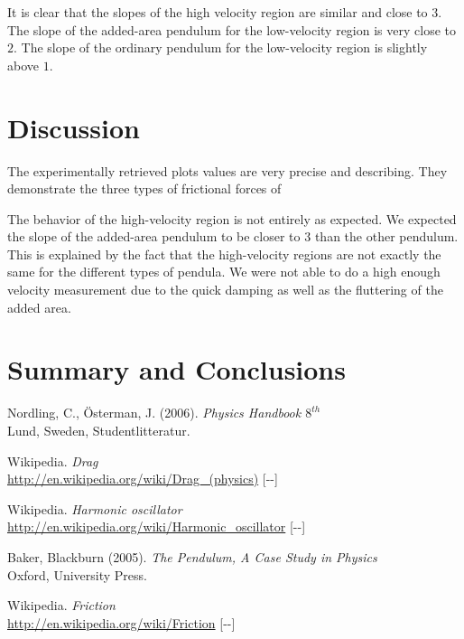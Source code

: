 \documentclass[11pt, a4paper]{article}
\newcommand{\todayswe}{\the\year-\twodigit\month-\twodigit\day}
\begin{document}
It is clear that the slopes of the high velocity region are similar and close to $3$. 
The slope of the added-area pendulum for the low-velocity region is very close to $2$.
The slope of the ordinary pendulum for the low-velocity region is slightly above $1$.



\section{Discussion}
The experimentally retrieved plots values are very precise and describing. 
They demonstrate the three types of frictional forces of 

The behavior of the high-velocity region is not entirely as expected. We expected 
the slope of the added-area pendulum 
to be closer to $3$ than the other pendulum.
This is explained by the fact that the high-velocity regions are not exactly the 
same for the different types of pendula. We were not 
able to do a high enough velocity measurement due to the quick damping as well as 
the fluttering of the added area.
\section{Summary and Conclusions}
\vfill

\begin{thebibliography}{99}
	 Nordling, C., Österman, J. (2006). 
  \textit{Physics Handbook  $8^{th}$}\\
  Lund, Sweden, Studentlitteratur.

   Wikipedia. \textit{Drag}\\ 
  \url{http://en.wikipedia.org/wiki/Drag_(physics)} [\todayswe]

   Wikipedia. \textit{Harmonic oscillator}\\ 
  \url{http://en.wikipedia.org/wiki/Harmonic_oscillator} [\todayswe]

	 Baker, Blackburn (2005). 
  \textit{The Pendulum, A Case Study in Physics}\\
  Oxford, University Press.

   Wikipedia. \textit{Friction}\\ 
  \url{http://en.wikipedia.org/wiki/Friction} [\todayswe]

\end{thebibliography}

\begin{appendix}
\end{appendix}

\end{document}
